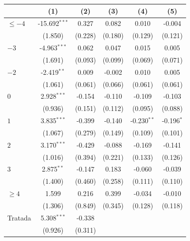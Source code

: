 
\begingroup
\centering
\begin{tabular}{lccccc}
   \toprule
                        & (1)             & (2)     & (3)     & (4)           & (5)\\  
   \midrule 
   $\leq -4$            & -15.692$^{***}$ & 0.327   & 0.082   & 0.010         & -0.004\\   
                        & (1.850)         & (0.228) & (0.180) & (0.129)       & (0.121)\\   
   $-3$                 & -4.963$^{***}$  & 0.062   & 0.047   & 0.015         & 0.005\\   
                        & (1.691)         & (0.093) & (0.099) & (0.069)       & (0.071)\\   
   $-2$                 & -2.419$^{**}$   & 0.009   & -0.002  & 0.010         & 0.005\\   
                        & (1.061)         & (0.061) & (0.066) & (0.061)       & (0.061)\\   
   $0$                  & 2.928$^{***}$   & -0.154  & -0.110  & -0.109        & -0.103\\   
                        & (0.936)         & (0.151) & (0.112) & (0.095)       & (0.088)\\   
   $1$                  & 3.835$^{***}$   & -0.399  & -0.140  & -0.230$^{**}$ & -0.196$^{*}$\\   
                        & (1.067)         & (0.279) & (0.149) & (0.109)       & (0.101)\\   
   $2$                  & 3.170$^{***}$   & -0.429  & -0.088  & -0.169        & -0.141\\   
                        & (1.016)         & (0.394) & (0.221) & (0.133)       & (0.126)\\   
   $3$                  & 2.875$^{**}$    & -0.147  & 0.183   & -0.060        & -0.039\\   
                        & (1.400)         & (0.460) & (0.258) & (0.111)       & (0.110)\\   
   $\geq 4$             & 1.599           & 0.216   & 0.399   & -0.034        & -0.010\\   
                        & (1.306)         & (0.849) & (0.345) & (0.128)       & (0.118)\\   
   Tratada              & 5.308$^{***}$   & -0.338  &         &               &   \\   
                        & (0.926)         & (0.311) &         &               &   \\   

\end{tabular}
